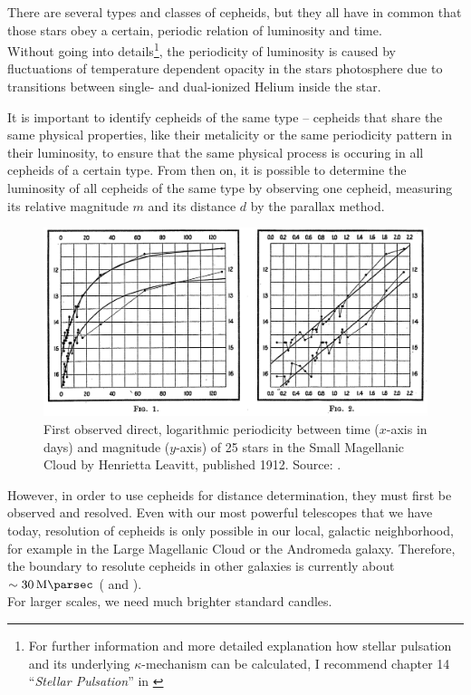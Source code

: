 There are several types and classes of cepheids, but they all have in common that those stars obey a certain, periodic relation of luminosity and time. \\

\noindent Without going into details\footnote{For further information and more detailed explanation how stellar pulsation and its underlying $\kappa$-mechanism can be calculated, I recommend chapter 14 ``\textit{Stellar Pulsation}'' in \cite{BradleyCarroll2007}}, the periodicity of luminosity is caused by fluctuations of temperature dependent opacity in the stars photosphere due to transitions between single- and dual-ionized Helium inside the star. 

\noindent It is important to identify cepheids of the same type -- cepheids that share the same physical properties, like their metalicity or the same periodicity pattern in their luminosity, to ensure that the same physical process is occuring in all cepheids of a certain type.
\noindent From then on, it is possible to determine the luminosity of all cepheids of the same type by observing one cepheid, measuring its relative magnitude $m$ and its distance $d$ by the parallax method. \\

\begin{figure}[H]
    \centering
    \includegraphics[scale=0.3]{figures/images/leavitt_period-luminosity.png}
    \caption{First observed direct, logarithmic periodicity between time ($x$-axis in days) and magnitude ($y$-axis) of 25 stars in the Small Magellanic Cloud by Henrietta Leavitt, published 1912. Source: \cite{Leavitt1912}.}
\end{figure}


\noindent However, in order to use cepheids for distance determination, they must first be observed and resolved.
Even with our most powerful telescopes that we have today, resolution of cepheids is only possible in our local, galactic neighborhood, for example in the Large Magellanic Cloud or the Andromeda galaxy. Therefore, the boundary to resolute cepheids in other galaxies is currently about $\sim \SI{30}{\mega \parsec}$ (\cite[p.~47]{Bartelmann2019} and \cite[p.~3]{Engelmann2013}). \\
For larger scales, we need much brighter standard candles.



